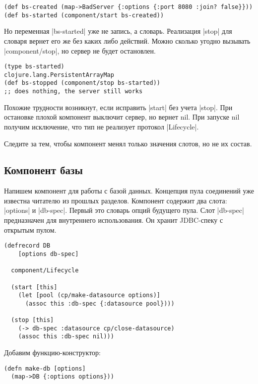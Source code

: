 \begin{verbatim}
(def bs-created (map->BadServer {:options {:port 8080 :join? false}}))
(def bs-started (component/start bs-created))
\end{verbatim}

Но переменная \spverb|bs-started| уже не запись, а словарь. Реализация \spverb|stop| для
словаря вернет его же без каких либо действий. Можно сколько угодно вызывать
\spverb|component/stop|, но сервер не будет остановлен.

\begin{verbatim}
(type bs-started)
clojure.lang.PersistentArrayMap
(def bs-stopped (component/stop bs-started))
;; does nothing, the server still works
\end{verbatim}

Похожие трудности возникнут, если исправить \spverb|start| без учета \spverb|stop|. При
остановке плохой компонент выключит сервер, но вернет nil. При запуске nil
получим исключение, что тип не реализует протокол \spverb|Lifecycle|.

Следите за тем, чтобы компонент менял только значения слотов, но не их состав.

\subsection{Компонент базы}

Напишем компонент для работы с базой данных. Концепция пула соединений уже
известна читателю из прошлых разделов. Компонент содержит два слота: \spverb|options| и
\spverb|db-spec|. Первый это словарь опций будущего пула. Слот \spverb|db-spec| предназначен
для внутреннего использования. Он хранит JDBC-спеку с открытым пулом.

\begin{verbatim}
(defrecord DB
    [options db-spec]

  component/Lifecycle

  (start [this]
    (let [pool (cp/make-datasource options)]
      (assoc this :db-spec {:datasource pool})))

  (stop [this]
    (-> db-spec :datasource cp/close-datasource)
    (assoc this :db-spec nil)))
\end{verbatim}

Добавим функцию-конструктор:

\begin{verbatim}
(defn make-db [options]
  (map->DB {:options options}))
\end{verbatim}

